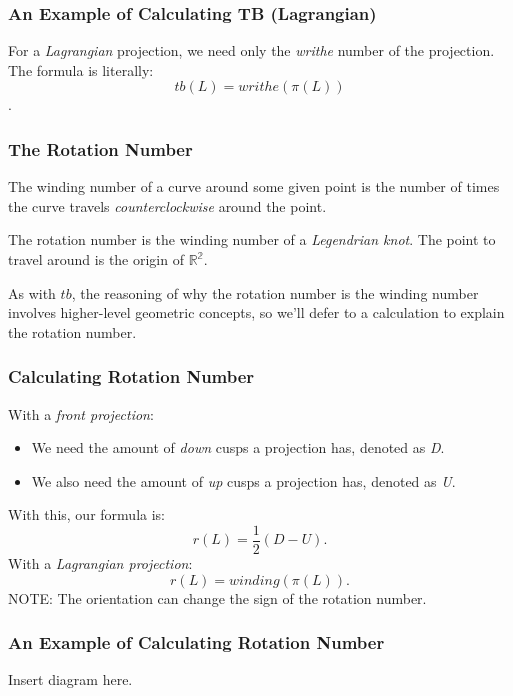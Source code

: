 \documentclass{beamer}
\begin{document}
\begin{frame}
    \frametitle{An Example of Calculating TB (Lagrangian)}
    For a \textit{Lagrangian} projection, we need only the \textit{writhe}
    number of the projection. \\
    The formula is literally:
    \[tb(L) = writhe(\pi(L))\].
\end{frame}

\begin{frame}
    \frametitle{The Rotation Number}
    \begin{definition}
        The \alert{winding number} of a curve around some given point
        is the number of times the curve travels \textit{counterclockwise}
        around the point.
    \end{definition}

    \begin{definition}
        The \alert{rotation number} is the winding number of a \textit{Legendrian
          knot}. The point to travel around is the origin of $\mathbb{R^2}.$
    \end{definition}
    As with $tb$, the reasoning of why the rotation number is the winding
    number involves higher-level geometric concepts, so we'll defer
    to a calculation to explain the rotation number.
\end{frame}


\begin{frame}
    \frametitle{Calculating Rotation Number}
    With a \textit{front projection}:
    \begin{itemize}
        \item{We need the amount of \textit{down} cusps a projection has, denoted
        as \textit{D}.}
      \item{We also need the amount of \textit{up} cusps a projection has,
      denoted as \textit{U}.}
    \end{itemize}
    With this, our formula is:
    \[r(L) = \frac{1}{2}(D - U).\]
    With a \textit{Lagrangian projection}:
    \[r(L) = winding(\pi(L)).\]
    \alert{NOTE}: The orientation can change the sign of the rotation number.
\end{frame}

\begin{frame}
    \frametitle{An Example of Calculating Rotation Number}
    Insert diagram here.
\end{frame}


     
    
\end{document}
